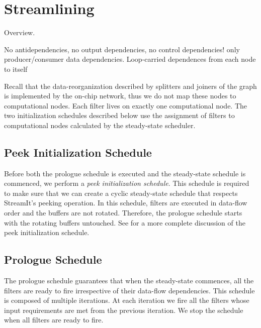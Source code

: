 \section{Streamlining}
Overview.

No antidependencies, no output dependencies, no control dependencies!
only producer/consumer data dependencies.
Loop-carried dependences from each node to itself

Recall that the data-reorganization described by splitters and joiners
of the graph is implemented by the on-chip network, thus we do not map
these nodes to computational nodes.  Each filter lives on exactly one
computational node.  The two initialization schedules described below
use the assignment of filters to computational nodes calculated by the
steady-state scheduler.

\subsection{Peek Initialization Schedule}
Before both the prologue schedule is executed and the steady-state
schedule is commenced, we perform a {\it peek initialization
schedule}.  This schedule is required to make sure that we can create
a cyclic steady-state schedule that respects StreamIt's peeking
operation.  In this schedule, filters are executed in data-flow order
and the buffers are not rotated.  Therefore, the prologue schedule
starts with the rotating buffers untouched.  See
\cite{streamitcc} for a more complete discussion of the peek
initialization schedule.

\subsection{Prologue Schedule}
The prologue schedule guarantees that when the steady-state commences,
all the filters are ready to fire irrespective of their data-flow
dependencies.  This schedule is composed of multiple iterations.  At
each iteration we fire all the filters whose input requirements are met
from the previous iteration.  We stop the schedule when all filters are
ready to fire.